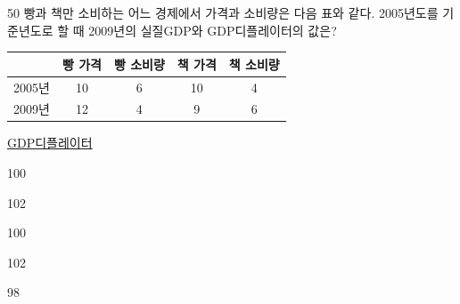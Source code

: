 \begin{question}{50}
빵과 책만 소비하는 어느 경제에서 가격과 소비량은 다음 표와 같다. 2005년도를 기준년도로 할 때 2009년의 실질GDP와 GDP디플레이터의 값은?

{\small\centering
\begin{tabular}{|c|c|c|c|c|}
\hline
 & 빵 가격 & 빵 소비량 & 책 가격 & 책 소비량 \\
\hline
2005년 & 10 & 6 & 10 & 4 \\
\hline
2009년 & 12 & 4 & 9 & 6 \\
\hline
\end{tabular}\par}

\noindent\hspace*{2em}\uline{GDP디플레이터}\par
\begin{choices}
  \item {}100
  \item {}102
  \item {}100
  \item {}102
  \item {}98
\end{choices}
\end{question}
